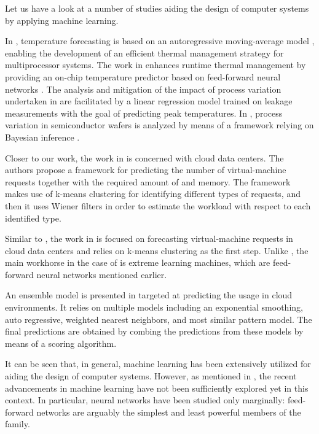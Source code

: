 Let us have a look at a number of studies aiding the design of computer systems
by applying machine learning.

In \cite{coskun2008}, temperature forecasting is based on an autoregressive
moving-average model \cite{hastie2009}, enabling the development of an efficient
thermal management strategy for multiprocessor systems. The work in
\cite{kumar2010} enhances runtime thermal management by providing an on-chip
temperature predictor based on feed-forward neural networks \cite{hastie2009}.
The analysis and mitigation of the impact of process variation undertaken in
\cite{juan2014} are facilitated by a linear regression model \cite{hastie2009}
trained on leakage measurements with the goal of predicting peak temperatures.
In \cite{ukhov2014}, process variation in semiconductor wafers is analyzed by
means of a framework relying on Bayesian inference \cite{hastie2009}.

Closer to our work, the work in \cite{dabbagh2015} is concerned with cloud data
centers. The authors propose a framework for predicting the number of
virtual-machine requests together with the required amount of  and
memory. The framework makes use of k-means clustering \cite{hastie2009} for
identifying different types of requests, and then it uses Wiener filters in
order to estimate the workload with respect to each identified type.

Similar to \cite{dabbagh2015}, the work in \cite{ismaeel2015} is focused on
forecasting virtual-machine requests in cloud data centers and relies on k-means
clustering as the first step. Unlike \cite{dabbagh2015}, the main workhorse in
the case of \cite{ismaeel2015} is extreme learning machines, which are
feed-forward neural networks mentioned earlier.

An ensemble model \cite{hastie2009} is presented in \cite{cao2014} targeted at
predicting the  usage in cloud environments. It relies on multiple
models including an exponential smoothing, auto regressive, weighted nearest
neighbors, and most similar pattern model. The final predictions are obtained by
combing the predictions from these models by means of a scoring algorithm.

It can be seen that, in general, machine learning has been extensively utilized
for aiding the design of computer systems. However, as mentioned in
, the recent advancements in machine learning have not been
sufficiently explored yet in this context. In particular, neural networks have
been studied only marginally: feed-forward networks are arguably the simplest
and least powerful members of the family.

